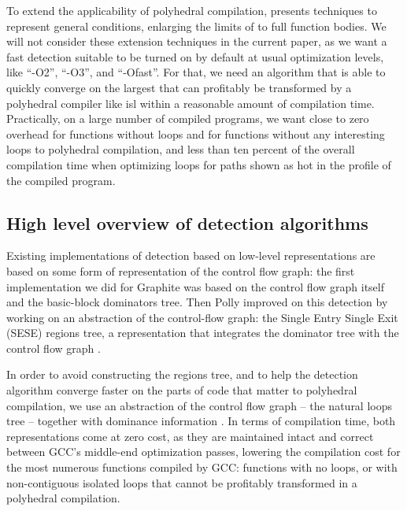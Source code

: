 \documentclass{sig-alternate}
\begin{document}
To extend the applicability of polyhedral compilation, \cite{scopExtend}
presents techniques to represent general conditions, enlarging the limits of
 to full function bodies.  We will not consider these \SCoP{} extension
techniques in the current paper, as we want a fast \SCoP{} detection suitable to be
turned on by default at usual optimization levels, like ``-O2'', ``-O3'', and
``-Ofast''.  For that, we need an algorithm that is able to quickly converge on
the largest  that can profitably be transformed by a polyhedral compiler
like isl \cite{verdoolaege2010isl} within a reasonable amount of compilation
time.  Practically, on a large number of compiled programs, we want close to
zero overhead for functions without loops and for functions without any
interesting loops to polyhedral compilation, and less than ten percent of the
overall compilation time when optimizing loops for paths shown as hot in the
profile of the compiled program.

\subsection{High level overview of \SCoP{} detection algorithms}

Existing implementations of \SCoP{} detection based on low-level representations
are based on some form of representation of the control flow graph: the first
implementation we did for Graphite \cite{graphite} was based on the control flow
graph itself and the basic-block dominators tree.  Then Polly improved on this
\SCoP{} detection \cite{polly, grosser2012polly} by working on an abstraction of
the control-flow graph: the Single Entry Single Exit (SESE) regions tree, a
representation that integrates the dominator tree with the control flow graph
\cite{sese}.

In order to avoid constructing the regions tree, and to help the \SCoP{}
detection algorithm converge faster on the parts of code that matter to
polyhedral compilation, we use an abstraction of the control flow graph -- the
natural loops tree \cite{dragonbook} -- together with dominance information
\cite{ramalingam}.  In terms of compilation time, both representations come at
zero cost, as they are maintained intact and correct between GCC's middle-end
optimization passes, lowering the compilation cost for the most numerous
functions compiled by GCC: functions with no loops, or with non-contiguous
isolated loops that cannot be profitably transformed in a polyhedral
compilation.
\end{document}
